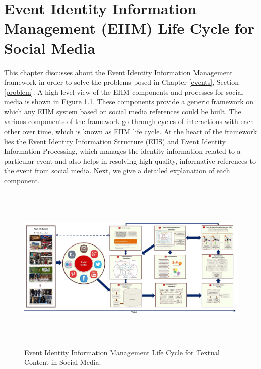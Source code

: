 
\chapter{Event Identity Information Management (EIIM) Life Cycle for Social Media} %

\label{eiim} %

\doublespacing
\setlength{\parindent}{1cm}


This chapter discusses about the Event Identity Information Management framework in order to solve the problems posed in Chapter \ref{events}, Section \ref{problem}. A high level view of the EIIM components and processes for social media is shown in Figure \ref{eiimcycle}. These components provide a generic framework on which any EIIM system based on social media references could be built. The various components of the framework go through cycles of interactions with each other over time, which is known as EIIM life cycle. At the heart of the framework lies the Event Identity Information Structure (EIIS) and Event Identity Information Processing, which manages the identity information related to a particular event and also helps in resolving high quality, informative references to the event from social media. Next, we give a detailed explanation of each component.

\begin{figure}[htbp]
  \caption{Event Identity Information Management Life Cycle for Textual Content in Social Media.}
	\label{eiimcycle}
  \centering
    \includegraphics[width=16cm,height=8cm]{Figures/EIIMpic.jpg}
\end{figure}



